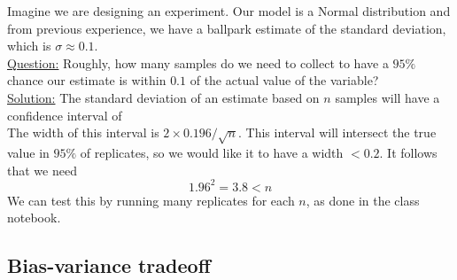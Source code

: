 \begin{example}[Estimating CI]
Imagine we are designing an experiment. Our model is a Normal distribution and from previous experience, we have a ballpark estimate of the standard deviation, which is $\sigma \approx 0.1$.  \\



\noindent
\underline{Question:} Roughly, how many samples do we need to collect to have a $95\%$ chance our estimate is within $0.1$ of the actual value of the variable?\\



\noindent
\underline{Solution:} The standard deviation of an estimate based on $n$ samples will have a confidence interval of 
\begin{equation*}
[\hat{\mu}-0.196/\sqrt{n},\hat{\mu} +  0.196/\sqrt{n}]
\end{equation*}
The width of this interval is $2 \times 0.196/\sqrt{n}$. This interval will intersect the true value in $95\%$ of replicates, so we would like it to have a width $<0.2$. It follows that we need 
\begin{equation*}
1.96^2 = 3.8 < n 
\end{equation*}
We can test this by running many replicates for each $n$, as done in the class notebook. 
\end{example}







\subsection{Bias-variance tradeoff}

